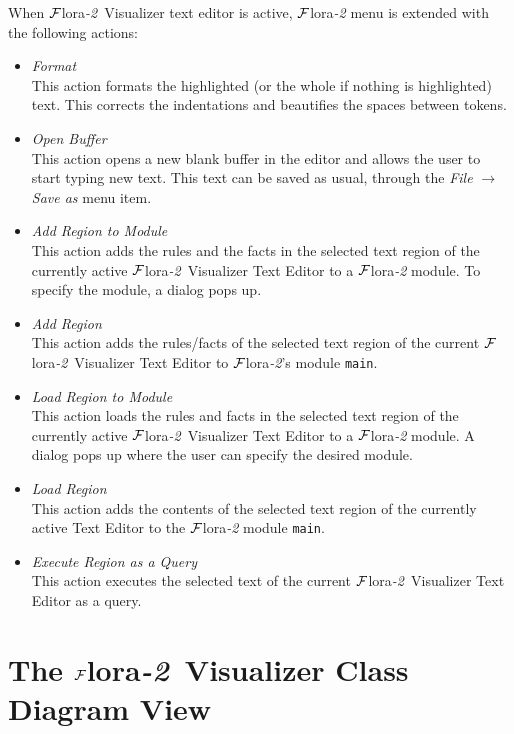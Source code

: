 \documentclass[a4paper,11pt]{article}
\newcommand{\FLORA}{{\mbox{\sc ${\cal F}${lora}\rm\emph{-2}}}\xspace}
\newcommand{\FVIZ}{{\mbox{\sc ${\cal F}${lora}\rm\emph{-2} {Visualizer}}}\xspace}
\begin{document}
When \FVIZ text editor is active,
\FLORA menu is extended with the following actions:

\begin{itemize}
\item \emph{Format}\\
  This action formats the highlighted (or the whole if nothing is
  highlighted) text.  This corrects the indentations and beautifies the
  spaces between tokens.

\item \emph{Open Buffer}\\
  This action opens a new blank buffer in the editor and allows the user to
  start typing new text. This text can be saved as usual, through the
  \emph{File} $\rightarrow$ \emph{Save as} menu item.

\item \emph{Add Region to Module}\\
  This action adds the rules and the facts in the
  selected text region of the currently active
  \FVIZ Text Editor to a \FLORA module.
  To specify the module, a dialog pops up.

\item \emph{Add Region}  \\
  This action adds the rules/facts of
  the selected text region of the current \FVIZ Text
  Editor to \FLORA's module {\tt main}.

\item \emph{Load Region to Module} \\
  This action loads the rules and facts in the
  selected text region of the currently active
  \FVIZ Text Editor to a
  \FLORA module.  A dialog pops up where the user can specify the desired
  module.

\item \emph{Load Region}  \\
  This action adds the contents of
  the selected text region of the currently active Text Editor to
  the \FLORA module {\tt main}. 

\item \emph{Execute Region as a Query}  \\
  This action executes the selected text of the current \FVIZ Text Editor
  as a query.

\end{itemize}

\section{The \FVIZ Class Diagram View}
\label{sec:visualizerview}
\end{document}
